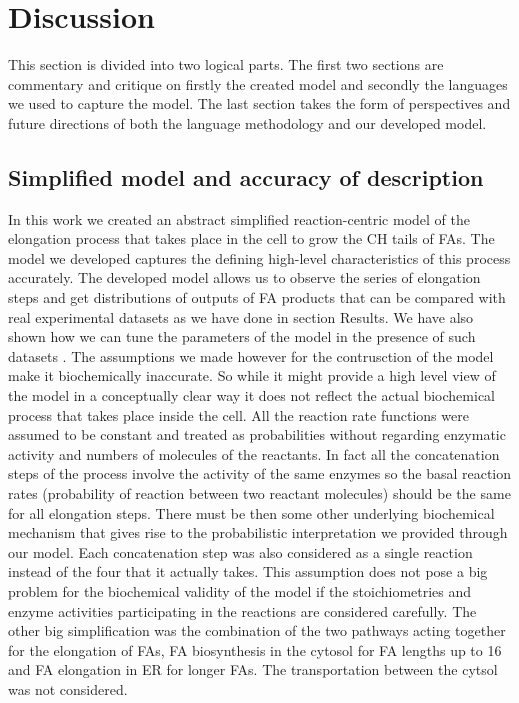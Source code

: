 \chapter{Discussion}

\ifpdf
    \graphicspath{{Discussion/Figs/Raster/}{Discussion/Figs/PDF/}{Discussion/Figs/}}
\else
    \graphicspath{{Discussion/Figs/Vector/}{Discussion/Figs/}}
\fi

This section is divided into two logical parts. The first two
sections are commentary and critique on firstly the created model and
secondly the languages we used to capture the model. The last section
takes the form of perspectives and future directions of both the
language methodology and our developed model.

\section{Simplified model and accuracy of description}
In this work we created an abstract simplified reaction-centric model of the elongation
process that takes place in the cell to grow the CH tails of
FAs. The model we developed captures the defining high-level
characteristics of this process accurately. The developed model allows
us to observe the series of elongation steps and get distributions of
outputs of FA products that can be compared with real experimental
datasets as we have done in section Results. We have also shown how
we can tune the parameters of the model in the presence of such datasets
. The assumptions we made however
for the contrusction of the model make it biochemically
inaccurate. So while it might provide a high level view of the model
in a conceptually clear way it does not reflect the
actual biochemical process that takes place inside the cell. All the
reaction rate functions were assumed to be constant and treated as
probabilities without regarding enzymatic activity and numbers of
molecules of the
reactants. In fact all the concatenation steps of the process involve
the activity of the same enzymes so the basal reaction rates
(probability of reaction between two reactant molecules) should be the same for
all elongation steps. There must be then some other underlying
biochemical mechanism that
gives rise to the probabilistic interpretation we provided through our
model. Each concatenation step was also considered as a single
reaction instead of the four that it actually takes. This assumption does not pose a big problem for the
biochemical validity of the model if the stoichiometries and enzyme
activities participating in the reactions are considered
carefully. The other big simplification was the combination of the two
pathways acting together for the elongation of FAs, FA biosynthesis in
the cytosol
for FA lengths up to 16 and FA elongation in ER for longer FAs. The
transportation between the cytsol was not considered.

